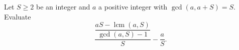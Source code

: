 Let $S\ge2$ be an integer and $a$ a positive integer with $\gcd(a,a+S)=S$. Evaluate
\[\dfrac{\dfrac{aS-\operatorname{lcm}(a,S)}{\gcd(a,S)-1}}{S}-\dfrac aS.\]
